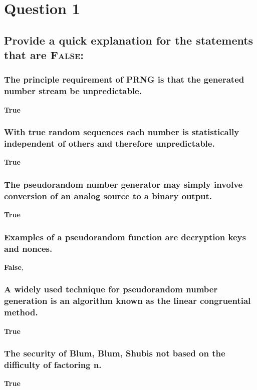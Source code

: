 \documentclass{report}
\begin{document}
	\section{Question 1}
	\startsection
		\renewcommand{\thesubsection}{\thesection.\Alph{subsection}}
		\subsection{Provide a quick explanation for the statements that are \textsc{False}:}
		\startsubsection
			\subsubsection{The principle requirement of PRNG is that the generated number stream be unpredictable.}
			\startsubsection
				\textbf{True}
			\closesection
			\subsubsection{With true random sequences each number is statistically independent of others and therefore unpredictable.}
			\startsubsection
				\textbf{True}
			\closesection
			\subsubsection{The pseudorandom number generator may simply involve conversion of an analog source to a binary output.}
			\startsubsection
				\textbf{True}
			\closesection
			\subsubsection{Examples of a pseudorandom function are decryption keys and nonces.}
			\startsubsection
				\textbf{False},
			\closesection
			\subsubsection{A widely used technique for pseudorandom number generation is an algorithm known as the linear congruential method.}
			\startsubsection
				\textbf{True}
			\closesection
			\subsubsection{The security of Blum, Blum, Shubis not based on the difficulty of factoring n.}
			\startsubsection
				\textbf{True}
			\closesection
		\closesection
	\closesection
\end{document}
